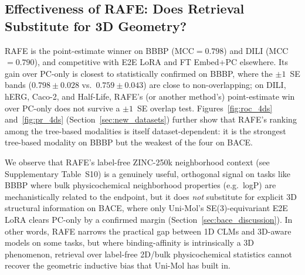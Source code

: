\documentclass[pdflatex,sn-mathphys-num]{sn-jnl}%
\begin{document}
\begin{table}[!ht]
\centering
\caption{Best configurations on drug Half-Life (regression, TDC ADMET Group, log1p target), ranked by Spearman.}
\label{tab:half_life}
\end{table}

\subsection{Effectiveness of RAFE: Does Retrieval Substitute for 3D Geometry?}\label{sec:rafe_effectiveness}
RAFE is the point-estimate winner on BBBP (MCC$=0.798$) and DILI (MCC$=0.790$), and competitive with E2E LoRA and FT Embed+PC elsewhere. Its gain over PC-only is closest to statistically confirmed on BBBP, where the $\pm1$~SE bands ($0.798\pm0.028$ vs.\ $0.759\pm0.043$) are close to non-overlapping; on DILI, hERG, Caco-2, and Half-Life, RAFE's (or another method's) point-estimate win over PC-only does not survive a $\pm1$~SE overlap test. Figures~\ref{fig:roc_4ds} and~\ref{fig:pr_4ds} (Section~\ref{sec:new_datasets}) further show that RAFE's ranking among the tree-based modalities is itself dataset-dependent: it is the strongest tree-based modality on BBBP but the weakest of the four on BACE.

We observe that RAFE's label-free ZINC-250k neighborhood context (see Supplementary Table~S10) is a genuinely useful, orthogonal signal on tasks like BBBP where bulk physicochemical neighborhood properties (e.g.\ logP) are mechanistically related to the endpoint, but it does \emph{not} substitute for explicit 3D structural information on BACE, where only Uni-Mol's SE(3)-equivariant E2E LoRA clears PC-only by a confirmed margin (Section~\ref{sec:bace_discussion}). In other words, RAFE narrows the practical gap between 1D CLMs and 3D-aware models on some tasks, but where binding-affinity is intrinsically a 3D phenomenon, retrieval over label-free 2D/bulk physicochemical statistics cannot recover the geometric inductive bias that Uni-Mol has built in.
\end{document}

